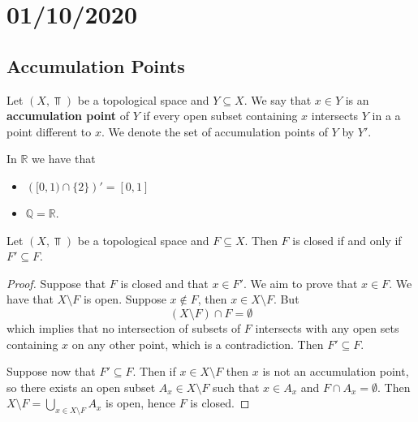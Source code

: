 \documentclass[../../main/main.tex]{subfiles}
\begin{document}
\chapter{01/10/2020}
\label{cpt:lec4}

\section{Accumulation Points}
\label{sec:label}


\begin{definition}
  Let $(X, \Top)$ be a topological space and $Y \subseteq X$. We say that $x \in Y$ is an {\bf accumulation point} of $Y$ if every open subset containing $x$ intersects $Y$ in a a point different to $x$. We denote the set of accumulation points of $Y$ by $Y'$.
\end{definition}

\begin{example}
  In $\mathbb{R}$ we have that
  \begin{itemize}
    \item $\left( [0, 1) \cap \{2\} \right)' = \left[ 0, 1 \right]$
    \item $\mathbb{Q} = \mathbb{R}$.
  \end{itemize}
\end{example}

\begin{theorem}
  \label{thm:accumulation-points}
  Let $(X, \Top)$ be a topological space and $F \subseteq X$. Then $F$ is closed if and only if $F' \subseteq F$.
\end{theorem}
\begin{proof}
  Suppose that $F$ is closed and that $x \in F'$. We aim to prove that $x \in F$. We have that $X \setminus F$ is open. Suppose $x \notin F$, then $x \in X \setminus F$. But
  \begin{equation*}
    \left( X \setminus F \right)  \cap F = \emptyset
  \end{equation*}
  which implies that no intersection of subsets of $F$ intersects with any open sets containing $x$ on any other point, which is a contradiction. Then $F' \subseteq F$.

  Suppose now that $F' \subseteq F$. Then if $x \in X \setminus F$ then $x$ is not an accumulation point, so there exists an open subset $A_{x} \in X \setminus F$ such that $x \in A_{x}$ and $F \cap A_{x} = \emptyset$. Then $X \setminus F = \bigcup_{x \in X \setminus F} A_{x}$ is open, hence $F$ is closed.
\end{proof}
\end{document}
